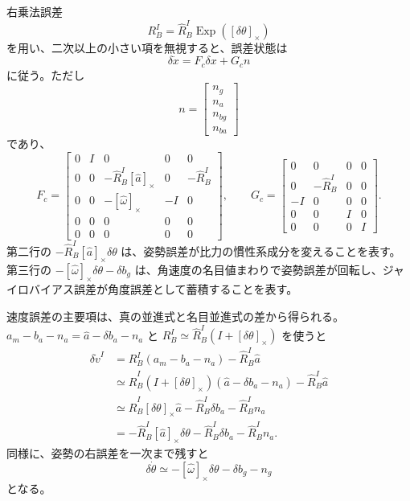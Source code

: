 右乗法誤差
\begin{equation}
  R^I_B=\hat{R}^I_B\operatorname{Exp}([\delta\theta]_\times)
\end{equation}
を用い、二次以上の小さい項を無視すると、誤差状態は
\begin{equation}
  \delta\dot{x}
  =
  F_c\delta x+G_cn
\end{equation}
に従う。ただし
\begin{equation}
  n=
  \begin{bmatrix}
    n_g\\ n_a\\ n_{bg}\\ n_{ba}
  \end{bmatrix}
\end{equation}
であり、
\begin{equation}
  F_c=
  \begin{bmatrix}
    0&I&0&0&0\\
    0&0&-\hat{R}^I_B[\hat{a}]_\times&0&-\hat{R}^I_B\\
    0&0&-[\hat{\omega}]_\times&-I&0\\
    0&0&0&0&0\\
    0&0&0&0&0
  \end{bmatrix},
  \qquad
  G_c=
  \begin{bmatrix}
    0&0&0&0\\
    0&-\hat{R}^I_B&0&0\\
    -I&0&0&0\\
    0&0&I&0\\
    0&0&0&I
  \end{bmatrix}.
\end{equation}
第二行の $-\hat{R}^I_B[\hat{a}]_\times\delta\theta$ は、姿勢誤差が比力の慣性系成分を変えることを表す。第三行の $-[\hat{\omega}]_\times\delta\theta-\delta b_g$ は、角速度の名目値まわりで姿勢誤差が回転し、ジャイロバイアス誤差が角度誤差として蓄積することを表す。

\begin{derivation}
速度誤差の主要項は、真の並進式と名目並進式の差から得られる。$a_m-b_a-n_a=\hat{a}-\delta b_a-n_a$ と $R^I_B\simeq\hat{R}^I_B(I+[\delta\theta]_\times)$ を使うと
\begin{align}
  \delta\dot{v}^I
  &=
  R^I_B(a_m-b_a-n_a)-\hat{R}^I_B\hat{a}\\
  &\simeq
  \hat{R}^I_B(I+[\delta\theta]_\times)
  (\hat{a}-\delta b_a-n_a)
  -\hat{R}^I_B\hat{a}\\
  &\simeq
  \hat{R}^I_B[\delta\theta]_\times\hat{a}
  -\hat{R}^I_B\delta b_a
  -\hat{R}^I_B n_a\\
  &=
  -\hat{R}^I_B[\hat{a}]_\times\delta\theta
  -\hat{R}^I_B\delta b_a
  -\hat{R}^I_B n_a .
\end{align}
同様に、姿勢の右誤差を一次まで残すと
\begin{equation}
  \delta\dot{\theta}
  \simeq
  -[\hat{\omega}]_\times\delta\theta-\delta b_g-n_g
\end{equation}
となる。
\end{derivation}

